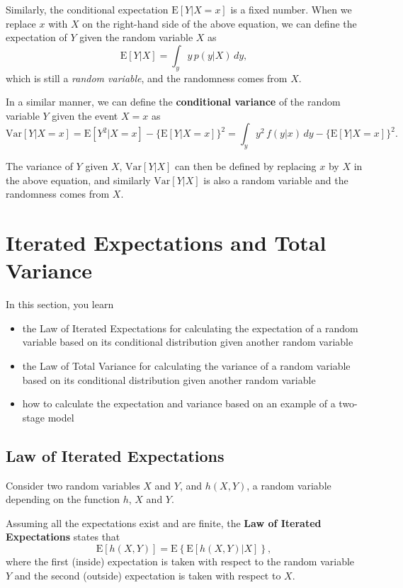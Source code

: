 \documentclass[]{book}
\providecommand{\tightlist}{%
  \setlength{\itemsep}{0pt}\setlength{\parskip}{0pt}}
\theoremstyle{definition}
\theoremstyle{definition}
\theoremstyle{definition}
\theoremstyle{remark}
\begin{document}
Similarly, the conditional expectation \(\mathrm{E}[Y|X=x]\) is a fixed
number. When we replace \(x\) with \(X\) on the right-hand side of the
above equation, we can define the expectation of \(Y\) given the random
variable \(X\) as \[\mathrm{E}[Y|X]=\int_y y\,p(y|X)\,dy,\] which is
still a \emph{random variable}, and the randomness comes from \(X\).

In a similar manner, we can define the \textbf{conditional variance} of
the random variable \(Y\) given the event \(X=x\) as
\[\mathrm{Var}[Y|X=x]=\mathrm{E}[Y^2|X=x]-\{\mathrm{E}[Y|X=x]\}^2=\int_y y^2\,f(y|x)\,dy-\{\mathrm{E}[Y|X=x]\}^2.\]

The variance of \(Y\) given \(X\), \(\mathrm{Var}[Y|X]\) can then be
defined by replacing \(x\) by \(X\) in the above equation, and similarly
\(\mathrm{Var}[Y|X]\) is also a random variable and the randomness comes
from \(X\).

\section{Iterated Expectations and Total Variance}\label{S:TS2a:IE}

In this section, you learn

\begin{itemize}
\tightlist
\item
  the Law of Iterated Expectations for calculating the expectation of a
  random variable based on its conditional distribution given another
  random variable
\item
  the Law of Total Variance for calculating the variance of a random
  variable based on its conditional distribution given another random
  variable
\item
  how to calculate the expectation and variance based on an example of a
  two-stage model
\end{itemize}

\subsection{Law of Iterated
Expectations}\label{law-of-iterated-expectations}

Consider two random variables \(X\) and \(Y\), and \(h(X,Y)\), a random
variable depending on the function \(h\), \(X\) and \(Y\).

Assuming all the expectations exist and are finite, the \textbf{Law of
Iterated Expectations} states that
\[\mathrm{E}[h(X,Y)]= \mathrm{E} \left\{ \mathrm{E} \left[ h(X,Y) | X \right] \right \},\]
where the first (inside) expectation is taken with respect to the random
variable \(Y\) and the second (outside) expectation is taken with
respect to \(X\).
\end{document}
